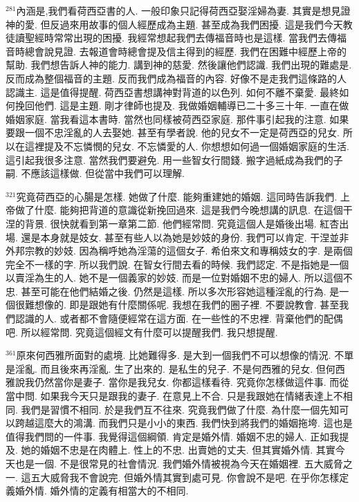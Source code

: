 \documentclass{book}
\begin{document}
$^{281}$內涵是,我們看荷西亞書的人.
一般印象只記得荷西亞娶淫婦為妻.
其實是想見證神的愛.
但反過來用故事的個人經歷成為主題.
甚至成為我們困擾.
這是我們今天教徒讀聖經時常常出現的困擾.
我經常想起我們去傳福音時也是這樣.
當我們去傳福音時總會說見證.
去報道會時總會提及信主得到的經歷.
我們在困難中經歷上帝的幫助.
我們想告訴人神的能力.
講到神的慈愛.
然後讓他們認識.
我們出現的難處是.
反而成為整個福音的主題.
反而我們成為福音的內容.
好像不是走我們這條路的人認識主.
這是值得提醒.
荷西亞書想講神對背道的以色列.
如何不離不棄愛.
最終如何挽回他們.
這是主題.
剛才律師也提及.
我做婚姻輔導已二十多三十年.
一直在做婚姻家庭.
當我看這本書時.
當然也同樣被荷西亞家庭.
那件事引起我的注意.
如果要跟一個不忠淫亂的人去娶她.
甚至有學者說.
他的兒女不一定是荷西亞的兒女.
所以在這裡提及不忘憐憫的兒女.
不忘憐愛的人.
你想想如何過一個婚姻家庭的生活.
這引起我很多注意.
當然我們要避免.
用一些智女行間錢.
搬字過紙成為我們的子嗣.
不應該這樣做.
但從當中我們可以理解.

$^{321}$究竟荷西亞的心腸是怎樣.
她做了什麼.
能夠重建她的婚姻.
這同時告訴我們.
上帝做了什麼.
能夠把背道的意識從新挽回過來.
這是我們今晚想講的訊息.
在這個干涅的背景.
很快就看到第一章第二節.
他們經常問.
究竟這個人是婚後出場.
紅杏出場.
還是本身就是妓女.
甚至有些人以為她是妙妓的身份.
我們可以肯定.
干涅並非外邦宗教的妙妓.
因為稱呼她為淫蕩的這個女子.
希伯來文和專稱妓女的字.
是兩個完全不一樣的字.
所以我們說.
在智女行間去看的時候.
我們認定.
不是指她是一個以賣淫為生的人.
她不是一個義家的妙妓.
而是一位對婚姻不忠的婦人.
所以這個不忠.
甚至可能在他們結婚之後.
仍然是這樣.
所以多次形容她這種淫亂的行為.
是一個很難想像的.
即是跟她有什麼關係呢.
我想在我們的圈子裡.
不要說教會.
甚至我們認識的人.
或者都不會隨便經常在這方面.
在一些性的不忠裡.
背棄他們的配偶吧.
所以經常問.
究竟這個經文有什麼可以提醒我們.
我只想提醒.

$^{361}$原來何西雅所面對的處境.
比她難得多.
是大到一個我們不可以想像的情況.
不單是淫亂.
而且後來再淫亂.
生了出來的.
是私生的兒子.
不是何西雅的兒女.
但何西雅說我仍然當你是妻子.
當你是我兒女.
你都這樣看待.
究竟你怎樣做這件事.
而從當中問.
如果我今天只是跟我的妻子.
在意見上不合.
只是我跟她在情緒表達上不相同.
我們是習慣不相同.
於是我們互不往來.
究竟我們做了什麼.
為什麼一個先知可以跨越這麼大的鴻溝.
而我們只是小小的東西.
我們快到將我們的婚姻拖垮.
這也是值得我們問的一件事.
我覺得這個綱領.
肯定是婚外情.
婚姻不忠的婦人.
正如我提及.
她的婚姻不忠是在肉體上.
性上的不忠.
出賣她的丈夫.
但其實婚外情.
其實今天也是一個.
不是很常見的社會情況.
我們婚外情被視為今天在婚姻裡.
五大威脅之一.
這五大威脅我不會說完.
但婚外情其實到處可見.
你會說不是吧.
在乎你怎樣定義婚外情.
婚外情的定義有相當大的不相同.
\end{document}
